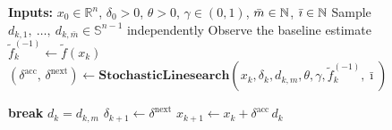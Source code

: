 \documentclass[11pt,a4paper]{article}
\newcommand{\R}{\mathbb{R}}
\newcommand{\N}{\ensuremath \mathbb{N}}
\newcommand{\f}{\tilde{f}}
\newcommand{\Imax}{\bar{\imath}}%
\newcommand{\Dexp}{p}
\newcommand{\sara}[1]{{\color{red}{\textbf{[SS: #1]}}\color{black}}}
\begin{document}
\begin{algorithm}[H]
\caption{DSE}
\label{alg:dse2-cartis}
\begin{algorithmic}[1]
\State \textbf{Inputs:} $x_0\in\R^n$, $\delta_0>0$, $\theta>0$, $\gamma\in(0,1)$, $\bar{m}\in\N$, $\Imax \in \N$
  \State Sample $d_{k,1}, \ \dots, \ d_{k,\bar{m}}\in \mathbb S^{n-1}$ independently
  \State Observe the baseline estimate $\tilde f_k^{(-1)}\gets \tilde f(x_k)$
    \State $(\delta^{\mathrm{acc}},\,\delta^{\mathrm{next}})
      \gets \textbf{StochasticLinesearch}\left(x_k,\delta_k,d_{k,m},\theta,\gamma, \f_k^{(-1)}, \Imax\right)$
   
      \State \textbf{break}
    \EndIf
  \EndFor
     \State $d_k=d_{k,m}$
    \State $ \delta_{k+1}\gets \delta^{\mathrm{next}}$
  \State $x_{k+1}\gets x_k+\delta^{\mathrm{acc}}\,d_{k}$
\EndFor
\end{algorithmic}
\end{algorithm}

            
\end{document}
